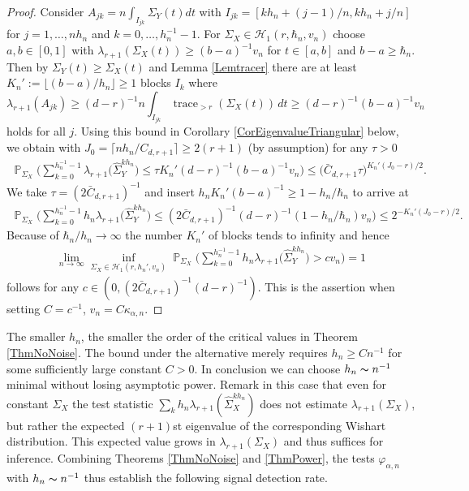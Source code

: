 \documentclass[preprint,aos]{imsart}
\numberwithin{equation}{section}
\theoremstyle{remark}
\DeclareMathOperator{\PP}{{\mathbb P}}
\DeclareMathOperator{\trace}{trace}
\renewcommand{\phi}{\varphi}
\providecommand{\floor}[1]{\lfloor #1 \rfloor}
\providecommand{\ceil}[1]{\lceil #1 \rceil}
\renewcommand{\le}{\leqslant}
\renewcommand{\ge}{\geqslant}
\begin{document}
\begin{proof}
Consider $A_{jk}=n\int_{I_{jk}}\Sigma_Y(t)dt$ with $I_{jk}=[kh_n+(j-1)/n,kh_n+j/n]$ for $j=1,\ldots,nh_n$ and $k=0,\ldots,h_n^{-1}-1$. For $\Sigma_X \in{\mathcal H}_1(r,\hbar_n,v_n)$ choose $a,b\in[0,1]$  with $\lambda_{r+1}(\Sigma_X(t))\ge (b-a)^{-1}v_n$ for $t\in[a,b]$ and $b-a\ge \hbar_n$. Then by $\Sigma_Y(t)\ge\Sigma_X(t)$ and Lemma \ref{Lemtracer} there are at least $K_n':=\floor{(b-a)/h_n}\ge 1$ blocks $I_k$ where
\[ \lambda_{r+1}(A_{jk})\ge (d-r)^{-1}n\int_{I_{jk}} \trace_{>r}(\Sigma_X(t))\,dt\ge (d-r)^{-1}(b-a)^{-1}v_n\]
holds for all $j$. Using this bound in Corollary \ref{CorEigenvalueTriangular} below, we obtain with $J_0=\ceil{nh_n/C_{d,r+1}}\ge 2(r+1)$ (by assumption) for any $\tau>0$
\begin{align*}
\PP_{\Sigma_X}\Big(\sum_{k=0}^{h_n^{-1}-1} \lambda_{r+1}\Big(\hat\Sigma_Y^{kh_n}\Big)\le \tau K_n'(d-r)^{-1}(b-a)^{-1}v_n\Big)\le
\Big(\bar C_{d,r+1}\tau\Big)^{K_n'(J_0-r)/2}.
\end{align*}
We take $\tau=(2\bar C_{d,r+1})^{-1}$ and insert
$h_nK_n'(b-a)^{-1}\ge 1-h_n/\hbar_n$
to arrive at
\begin{align*}
\PP_{\Sigma_X}\Big(\sum_{k=0}^{h_n^{-1}-1} h_n\lambda_{r+1}\Big(\hat\Sigma_Y^{kh_n}\Big)\le (2\bar C_{d,r+1})^{-1} (d-r)^{-1}(1-h_n/\hbar_n)v_n\Big)\le
2^{-K_n'(J_0-r)/2}.
\end{align*}
Because of $\hbar_n/h_n\to\infty$ the number $K_n'$ of blocks tends to infinity and hence
\begin{align*}
\lim_{n\to\infty}\inf_{\Sigma_X\in{\mathcal H}_1(r,h_n',v_n)}\PP_{\Sigma_X}\Big(\sum_{k=0}^{h_n^{-1}-1} h_n\lambda_{r+1}\Big(\hat\Sigma_Y^{kh_n}\Big)> cv_n\Big)=1
\end{align*}
follows for any $c\in(0,(2\bar C_{d,r+1})^{-1}(d-r)^{-1})$.  This is the assertion when setting $C=c^{-1}$, $v_n=C\kappa_{\alpha,n}$.
\end{proof}

The smaller $h_n$, the smaller the order of the critical values in Theorem \ref{ThmNoNoise}. The bound under the alternative merely requires $h_n\ge Cn^{-1}$ for some sufficiently large constant $C>0$. In conclusion we can choose $h_n\thicksim n^{-1}$ minimal without losing asymptotic power. Remark in this case that even for constant $\Sigma_X$ the test statistic $\sum_k h_n\lambda_{r+1}(\hat\Sigma_X^{kh_n})$ does not estimate $\lambda_{r+1}(\Sigma_X)$, but rather the expected $(r+1)$st eigenvalue of the corresponding Wishart distribution. This expected value grows in $\lambda_{r+1}(\Sigma_X)$ and thus suffices for inference. Combining Theorems \ref{ThmNoNoise} and \ref{ThmPower}, the tests $\phi_{\alpha,n}$ with $h_n\thicksim n^{-1}$ thus establish the following signal detection rate.
\end{document}
